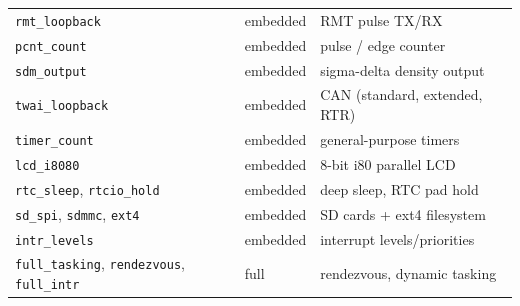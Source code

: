 \begin{center}
\begin{longtable}{@{}l l l@{}}
\texttt{rmt\_loopback}   & embedded & RMT pulse TX/RX \\
\texttt{pcnt\_count}     & embedded & pulse / edge counter \\
\texttt{sdm\_output}     & embedded & sigma-delta density output \\
\texttt{twai\_loopback}  & embedded & CAN (standard, extended, RTR) \\
\texttt{timer\_count}    & embedded & general-purpose timers \\
\texttt{lcd\_i8080}      & embedded & 8-bit i80 parallel LCD \\
\texttt{rtc\_sleep}, \texttt{rtcio\_hold} & embedded & deep sleep, RTC pad hold \\
\texttt{sd\_spi}, \texttt{sdmmc}, \texttt{ext4} & embedded & SD cards + ext4 filesystem \\
\texttt{intr\_levels}    & embedded & interrupt levels/priorities \\
\texttt{full\_tasking}, \texttt{rendezvous}, \texttt{full\_intr} & full & rendezvous, dynamic tasking \\
\bottomrule
\end{longtable}
\end{center}
